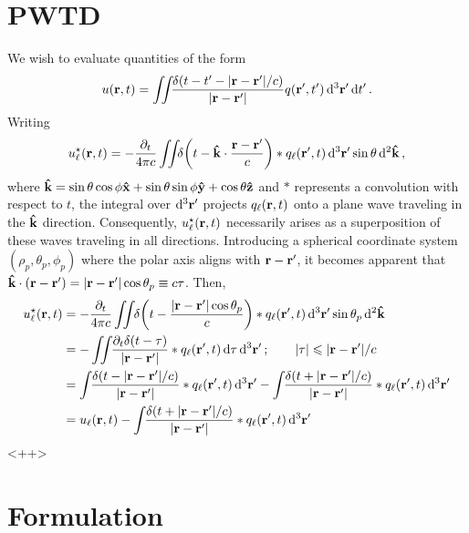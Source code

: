 \section{PWTD}

We wish to evaluate quantities of the form
\begin{equation}
  u(\vb{r}, t) = \iint_{} \frac{\delta(t - t' - \abs{\vb{r} - \vb{r}'}/c)}{\abs{\vb{r} - \vb{r}'}} q(\vb{r}', t') \dd[3]{\vb{r}'} \dd{t'}.
\end{equation}
Writing
\begin{equation}
  u_\ell^\star(\vb{r}, t) = - \frac{\partial_t}{4\pi c} \iint_{} \delta\qty(t - \vu{k} \cdot \frac{\vb{r} - \vb{r}'}{c}) * q_\ell(\vb{r}', t) \dd[3]{\vb{r}'} \sin\theta \dd[2]{\vu{k}},
\end{equation}
where $\vu{k} = \sin\theta \cos\phi \vu{x} + \sin\theta \sin\phi \vu{y} + \cos\theta \vu{z}$ and $*$ represents a convolution with respect to $t$, the integral over $\dd[3]{\vb{r}'}$ projects $q_\ell(\vb{r}, t)$ onto a plane wave traveling in the $\vu{k}$ direction.
Consequently, $u_\ell^\star(\vb{r}, t)$ necessarily arises as a superposition of these waves traveling in all directions.
Introducing a spherical coordinate system $(\rho_p, \theta_p, \phi_p)$ where the polar axis aligns with $\vb{r} - \vb{r}'$, it becomes apparent that $\vu{k} \cdot (\vb{r} - \vb{r}') = \abs{\vb{r} - \vb{r}'}\cos \theta_p \equiv c \tau$.
Then,
\begin{align}
  u_\ell^\star(\vb{r}, t) &= -\frac{\partial_t}{4 \pi c} \iint_{} \kern0.1em \delta\qty(t - \frac{\abs{\vb{r} - \vb{r}'}\cos\theta_p}{c}) * q_\ell(\vb{r}', t) \dd[3]{\vb{r}'} \sin\theta_p \dd[2]{\vu{k}} \\
  &= -\iint_{} \kern0.1em \frac{\partial_t \delta(t - \tau)}{\abs{\vb{r} - \vb{r}'}} * q_\ell(\vb{r}', t) \dd{\tau} \dd[3]{\vb{r}'}; \qquad \abs{\tau} \leqslant \abs{\vb{r} - \vb{r}'}/c \\
  &= \int_{} \kern0.1em \frac{\delta(t - \abs{\vb{r} - \vb{r}'}/c)}{\abs{\vb{r} - \vb{r}'}} * q_\ell(\vb{r}', t) \dd[3]{\vb{r}'} - \int_{} \kern0.1em \frac{\delta(t + \abs{\vb{r} - \vb{r}'}/c)}{\abs{\vb{r} - \vb{r}'}} * q_\ell(\vb{r}', t) \dd[3]{\vb{r}'} \\
  &= u_\ell(\vb{r}, t) - \int_{} \kern0.1em \frac{\delta(t + \abs{\vb{r} - \vb{r}'}/c)}{\abs{\vb{r} - \vb{r}'}} * q_\ell(\vb{r}', t) \dd[3]{\vb{r}'}
  \label{<+label+>}
\end{align}<++>



\section{Formulation}

